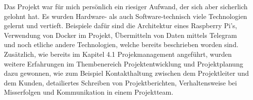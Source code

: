 Das Projekt war für mich persönlich ein riesiger Aufwand, der sich aber sicherlich 
gelohnt hat. Es wurden Hardware- als auch Software-technisch viele Technologien gelernt und vertieft. 
Beispiele dafür sind die Architektur eines Raspberry Pi's, Verwendung von Docker im Projekt,
 Übermitteln von Daten mittels Telegram und noch etliche andere Technologien, welche bereits beschrieben worden 
 sind. 
 \\Zusätzlich, wie bereits im Kapitel 4.1 Projekmanagement angeführt, wurden weitere Erfahrungen im 
Thembenereich Projektentwicklung und Projektplanung dazu gewonnen, wie zum Beispiel Kontakthaltung zwischen dem
Projektleiter und dem Kunden, detailiertes Schreiben von Projektberichten, Verhaltensweise bei 
Misserfolgen und Kommunikation in einem Projektteam. 